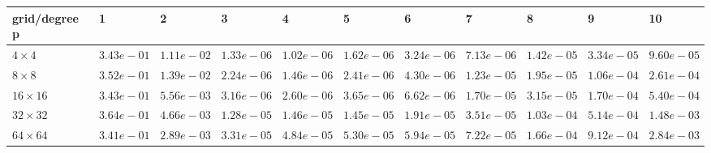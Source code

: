 \begin{tabular}{lllllllllll}
\hline
 grid/degree p   & 1          & 2          & 3          & 4          & 5          & 6          & 7          & 8          & 9          & 10         \\
\hline
 $4 \times 4$    & $3.43e-01$ & $1.11e-02$ & $1.33e-06$ & $1.02e-06$ & $1.62e-06$ & $3.24e-06$ & $7.13e-06$ & $1.42e-05$ & $3.34e-05$ & $9.60e-05$ \\
 $8 \times 8$    & $3.52e-01$ & $1.39e-02$ & $2.24e-06$ & $1.46e-06$ & $2.41e-06$ & $4.30e-06$ & $1.23e-05$ & $1.95e-05$ & $1.06e-04$ & $2.61e-04$ \\
 $16 \times 16$  & $3.43e-01$ & $5.56e-03$ & $3.16e-06$ & $2.60e-06$ & $3.65e-06$ & $6.62e-06$ & $1.70e-05$ & $3.15e-05$ & $1.70e-04$ & $5.40e-04$ \\
 $32 \times 32$  & $3.64e-01$ & $4.66e-03$ & $1.28e-05$ & $1.46e-05$ & $1.45e-05$ & $1.91e-05$ & $3.51e-05$ & $1.03e-04$ & $5.14e-04$ & $1.48e-03$ \\
 $64 \times 64$  & $3.41e-01$ & $2.89e-03$ & $3.31e-05$ & $4.84e-05$ & $5.30e-05$ & $5.94e-05$ & $7.22e-05$ & $1.66e-04$ & $9.12e-04$ & $2.84e-03$ \\
\hline
\end{tabular}